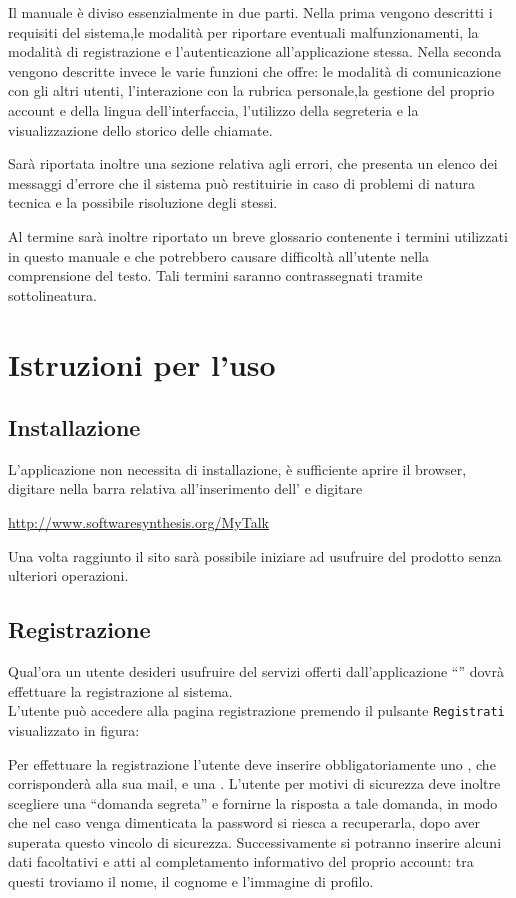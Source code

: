 Il manuale è diviso essenzialmente in due parti.
Nella prima vengono descritti i requisiti del sistema,le modalità per riportare eventuali malfunzionamenti, la modalità di registrazione e l'autenticazione all'applicazione stessa. 
Nella seconda vengono descritte invece le varie funzioni che \caName offre: le modalità di comunicazione con gli altri utenti, l'interazione con la rubrica personale,la gestione del proprio account e della lingua dell'interfaccia, l'utilizzo della segreteria e la visualizzazione dello storico delle chiamate.

Sarà riportata inoltre una sezione relativa agli errori, che presenta un elenco dei messaggi d'errore che il sistema può restituirie in caso di problemi di natura tecnica e la possibile risoluzione degli stessi. 

Al termine sarà inoltre riportato un breve glossario contenente i termini utilizzati in questo manuale e che potrebbero causare difficoltà all'utente nella comprensione del testo. Tali termini saranno contrassegnati tramite sottolineatura. 

\section{Istruzioni per l'uso}

\subsection{Installazione}
L'applicazione non necessita di installazione, è sufficiente aprire il browser, digitare nella barra relativa all'inserimento dell' e digitare
\begin{center}
 \url{http://www.softwaresynthesis.org/MyTalk}
\end{center}
Una volta raggiunto il sito sarà possibile iniziare ad usufruire del prodotto senza ulteriori operazioni.

\subsection{Registrazione}
Qual'ora un utente desideri usufruire del servizi offerti dall'applicazione ``\caName'' dovrà effettuare la registrazione al sistema.\\
L'utente può accedere alla pagina registrazione premendo il pulsante \texttt{Registrati} visualizzato in figura:

Per effettuare la registrazione l'utente deve inserire obbligatoriamente uno , che corrisponderà alla sua mail, e una .
L'utente per motivi di sicurezza deve inoltre scegliere una ``domanda segreta'' e fornirne la risposta a tale domanda, in modo che nel caso venga dimenticata la password si riesca a recuperarla, dopo aver superata questo vincolo di sicurezza.
Successivamente si potranno inserire alcuni dati facoltativi e atti al completamento informativo del proprio account: tra questi troviamo il nome, il cognome e l'immagine di profilo.

